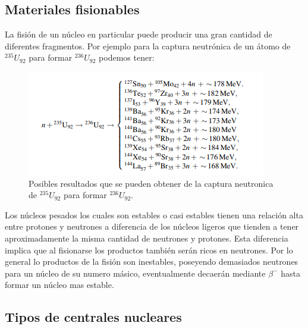 \subsection{Materiales fisionables}
La fisión de un núcleo en particular puede producir una gran cantidad de diferentes fragmentos. Por ejemplo para la captura neutrónica de un átomo de $^{235}U_{92}$ para formar $^{236}U_{92}$  podemos tener: \cite{Sanctis.2016}
\begin{figure}[H]
    \centering
    \includegraphics[scale=.925]{imagenes/posibilidades.png}
    \caption{Posibles resultados que se pueden obtener de la captura neutronica de $^{235}U_{92}$ para formar $^{236}U_{92}$.\cite{Sanctis.2016}}
    \label{fig:posibilidades}
\end{figure}        
Los núcleos pesados los cuales son estables o casi estables tienen una relación alta entre protones y neutrones a diferencia de los núcleos ligeros que tienden a tener aproximadamente la misma cantidad de neutrones y protones. Esta diferencia implica que al fisionarse los productos también serán ricos en neutrones. Por lo general lo productos de la fisión son inestables, poseyendo demasiados neutrones para un núcleo de su  numero másico, eventualmente decaerán mediante $\beta^-$ hasta formar un núcleo mas estable. 
\subsection{Tipos de centrales nucleares}